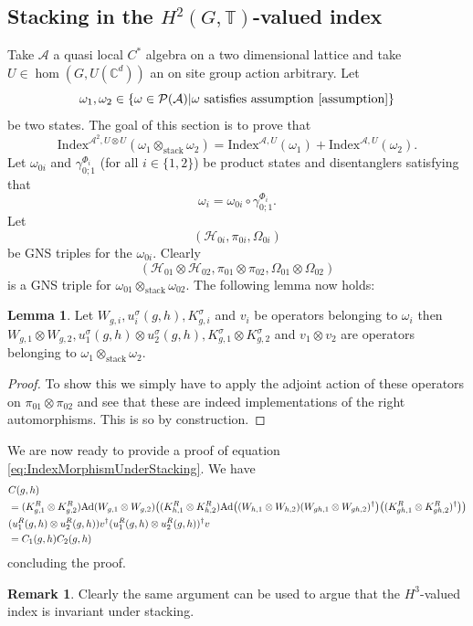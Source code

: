 \documentclass[12pt,a4paper,twoside]{article}
\let\originalleft\left
\let\originalright\right
\renewcommand{\left}{\mathopen{}\mathclose\bgroup\originalleft}
\renewcommand{\right}{\aftergroup\egroup\originalright}
\newcommand{\PP}{\mathcal P}
\newcommand{\HH}{\mathcal H}
\newcommand{\CC}{\mathbb C}
\newcommand{\TT}{\mathbb T}
\renewcommand{\AA}{\mathcal A}
\newcommand{\Ad}[1]{\textrm{Ad}\left(#1\right)}
\theoremstyle{definition}
\newtheorem{lemma}[theorem]{Lemma}
\newtheorem{remark}[theorem]{Remark}
\numberwithin{equation}{section}
\begin{document}
\subsection{Stacking in the $H^2(G,\TT)$-valued index}\label{sec:StackingOneTranslation}
Take $\AA$ a quasi local $C^*$ algebra on a two dimensional lattice and take $U\in\hom(G,U(\CC^d))$ an on site group action arbitrary. Let
\begin{equation}
	\omega_1,\omega_2\in\{\omega\in\PP(\AA)|\omega\text{ satisfies assumption \ref{assumption}}\}
\end{equation}
be two states. The goal of this section is to prove that
\begin{equation}\label{eq:IndexMorphismUnderStacking}
	\textrm{Index}^{\AA^2,U\otimes U}(\omega_1\otimes_{\text{stack}}\omega_2)=\textrm{Index}^{\AA,U}(\omega_1)+\textrm{Index}^{\AA,U}(\omega_2).
\end{equation}
Let $\omega_{0i}$ and $\gamma_{0;1}^{\Phi_i}$ (for all $i\in\{1,2\}$) be product states and disentanglers satisfying that
\begin{equation}
	\omega_i=\omega_{0i}\circ\gamma_{0;1}^{\Phi_i}.
\end{equation}
Let
\begin{equation}
	(\HH_{0i},\pi_{0i},\Omega_{0i})
\end{equation}
be GNS triples for the $\omega_{0i}$. Clearly
\begin{equation}
	(\HH_{01}\otimes\HH_{02},\pi_{01}\otimes\pi_{02},\Omega_{01}\otimes\Omega_{02})
\end{equation}
is a GNS triple for $\omega_{01}\otimes_{\text{stack}}\omega_{02}$. The following lemma now holds:
\begin{lemma}
	Let $W_{g,i},u^\sigma_i(g,h),K_{g,i}^\sigma$ and $v_{i}$ be operators belonging to $\omega_i$ then $W_{g,1}\otimes W_{g,2},u^\sigma_1(g,h)\otimes u^\sigma_2(g,h),K_{g,1}^\sigma\otimes K_{g,2}^\sigma$ and $v_{1}\otimes v_{2}$ are operators belonging to $\omega_1\otimes_{\text{stack}}\omega_2$.
\end{lemma}
\begin{proof}
	To show this we simply have to apply the adjoint action of these operators on $\pi_{01}\otimes\pi_{02}$ and see that these are indeed implementations of the right automorphisms. This is so by construction.
\end{proof}
We are now ready to provide a proof of equation \ref{eq:IndexMorphismUnderStacking}. We have
\begin{align}
	&C(g,h)\\
	\nonumber
	&=(K_{g,1}^R\otimes K_{g,2}^R)\Ad{W_{g,1}\otimes W_{g,2}}\left((K_{h,1}^R\otimes K_{h,2}^R)\Ad{(W_{h,1}\otimes W_{h,2})(W_{gh,1}\otimes W_{gh,2})^\dagger}\left((K_{gh,1}^R\otimes K_{gh,2}^R)^\dagger\right)\right)\\
	&(u^R_1(g,h)\otimes u^R_2(g,h))v^\dagger (u^R_1(g,h)\otimes u^R_2(g,h))^\dagger v\\
	&=C_1(g,h)C_2(g,h)
\end{align}
concluding the proof.
\begin{remark}\label{rem:StackingH3ValuedIndex}
	Clearly the same argument can be used to argue that the $H^3$-valued index is invariant under stacking.
\end{remark}
\end{document}
